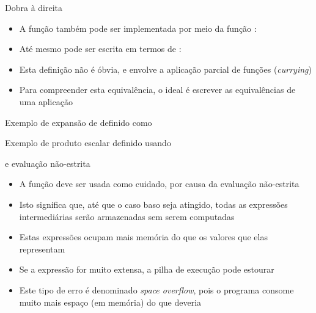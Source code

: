 \begin{frame}[fragile]{Dobra à direita}

    \begin{itemize}
        \item A função  também pode ser implementada por meio da função
            :


        \item Até mesmo  pode ser escrita em termos de :


        \item Esta definição não é óbvia, e envolve a aplicação parcial de funções 
            (\textit{currying})

        \item Para compreender esta equivalência, o ideal é escrever as equivalências de uma
            aplicação
    \end{itemize}

\end{frame}

\begin{frame}[fragile]{Exemplo de expansão de  definido como 
}
\end{frame}

\begin{frame}[fragile]{Exemplo de produto escalar definido usando }
\end{frame}

\begin{frame}[fragile]{ e evaluação não-estrita}

    \begin{itemize}
        \item A função  deve ser usada como cuidado, por causa da evaluação
            não-estrita

        \item Isto significa que, até que o caso baso seja atingido, todas as expressões
            intermediárias serão armazenadas sem serem computadas
        
        \item Estas expressões ocupam mais memória do que os valores que elas representam

        \item Se a expressão for muito extensa, a pilha de execução pode estourar


        \item Este tipo de erro é denominado \textit{space overflow}, pois o programa consome
            muito mais espaço (em memória) do que deveria

    \end{itemize}

\end{frame}
